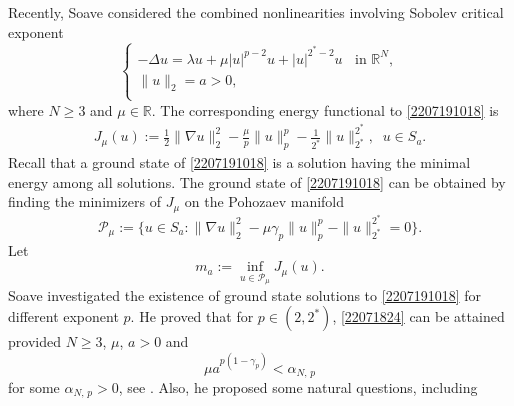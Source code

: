 \documentclass[10pt]{article}
\numberwithin{equation}{section}
\numberwithin{equation}{section}
\begin{document}
Recently, Soave \cite{Soave20_JFA} considered the combined nonlinearities involving Sobolev critical exponent
\begin{equation}\label{2207191018}
\begin{cases}
-\Delta u=\lambda u+ \mu|u|^{p-2}u+ |u|^{2^*-2}u \;\;\text { in } \mathbb{R}^N, \\
\|u\|_{2}=a>0,\\
\end{cases}
\end{equation}
where $N\ge 3$ and $\mu\in \mathbb{R}$. The corresponding energy functional to \eqref{2207191018} is
\begin{equation*}
\begin{aligned}
J_{\mu}(u):=\frac{1}{2}\|\nabla u\|_2^2
-\frac{\mu}{p}\|u\|_p^{p}
-\frac{1}{2^{*}}\|u\|_{2^*}^{2^{*}},\;\; u\in S_a.
\end{aligned}
\end{equation*}
Recall that a ground state of \eqref{2207191018} is a solution having the minimal energy among all solutions. The ground state of \eqref{2207191018} can be obtained by finding the minimizers of $J_{\mu}$ on the
Pohozaev manifold
\[
\mathcal{P}_{\mu}:=\{u\in S_a: \|\nabla u\|_2^2-\mu \gamma_p\|u\|_p^p-\|u\|_{2^*}^{2^*}=0 \}.
\]
Let
\begin{equation}\label{22071824}
m_{a}:= \underset{u\in \mathcal{P}_{\mu}}{\inf}{J_{\mu}(u)}.
\end{equation}
Soave investigated the existence of ground state solutions to \eqref{2207191018} for different exponent $p$.
He proved that for $p\in (2, 2^*)$, \eqref{22071824} can be attained provided $N\ge 3$, $\mu$, $a>0$ and
\begin{equation}\label{2312232020}
 \mu a^{{p(1-\gamma_p)}}<\alpha_{N,\, p}
\end{equation}
for some $\alpha_{N,\, p}>0$, see \cite[Theorem 1.1]{Soave20_JFA}. Also, he proposed some natural questions, including
\end{document}
